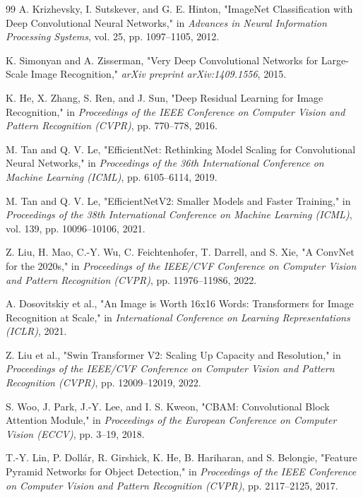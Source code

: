 \documentclass[12pt,a4paper]{report}
\begin{document}
\begin{thebibliography}{99}
 A. Krizhevsky, I. Sutskever, and G. E. Hinton, "ImageNet Classification with Deep Convolutional Neural Networks," in \textit{Advances in Neural Information Processing Systems}, vol. 25, pp. 1097--1105, 2012.

 K. Simonyan and A. Zisserman, "Very Deep Convolutional Networks for Large-Scale Image Recognition," \textit{arXiv preprint arXiv:1409.1556}, 2015.

 K. He, X. Zhang, S. Ren, and J. Sun, "Deep Residual Learning for Image Recognition," in \textit{Proceedings of the IEEE Conference on Computer Vision and Pattern Recognition (CVPR)}, pp. 770--778, 2016.

 M. Tan and Q. V. Le, "EfficientNet: Rethinking Model Scaling for Convolutional Neural Networks," in \textit{Proceedings of the 36th International Conference on Machine Learning (ICML)}, pp. 6105--6114, 2019.

 M. Tan and Q. V. Le, "EfficientNetV2: Smaller Models and Faster Training," in \textit{Proceedings of the 38th International Conference on Machine Learning (ICML)}, vol. 139, pp. 10096--10106, 2021.

 Z. Liu, H. Mao, C.-Y. Wu, C. Feichtenhofer, T. Darrell, and S. Xie, "A ConvNet for the 2020s," in \textit{Proceedings of the IEEE/CVF Conference on Computer Vision and Pattern Recognition (CVPR)}, pp. 11976--11986, 2022.

 A. Dosovitskiy et al., "An Image is Worth 16x16 Words: Transformers for Image Recognition at Scale," in \textit{International Conference on Learning Representations (ICLR)}, 2021.

 Z. Liu et al., "Swin Transformer V2: Scaling Up Capacity and Resolution," in \textit{Proceedings of the IEEE/CVF Conference on Computer Vision and Pattern Recognition (CVPR)}, pp. 12009--12019, 2022.

 S. Woo, J. Park, J.-Y. Lee, and I. S. Kweon, "CBAM: Convolutional Block Attention Module," in \textit{Proceedings of the European Conference on Computer Vision (ECCV)}, pp. 3--19, 2018.

 T.-Y. Lin, P. Dollár, R. Girshick, K. He, B. Hariharan, and S. Belongie, "Feature Pyramid Networks for Object Detection," in \textit{Proceedings of the IEEE Conference on Computer Vision and Pattern Recognition (CVPR)}, pp. 2117--2125, 2017.


\end{thebibliography}
\end{document}
